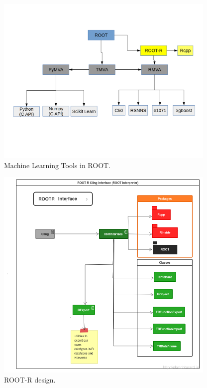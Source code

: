 \documentclass[a4paper]{jpconf}
\begin{document}
\begin{figure}[h]
\centering
\includegraphics[width=25pc]{img/tmva.png}\caption{\label{tmva:label} Machine Learning Tools in ROOT.}
\end{figure}



\begin{figure}[h]
\centering
\includegraphics[width=25pc]{img/rootr.png}\caption{\label{rootr:label} ROOT-R design.}
\end{figure}
\end{document}
